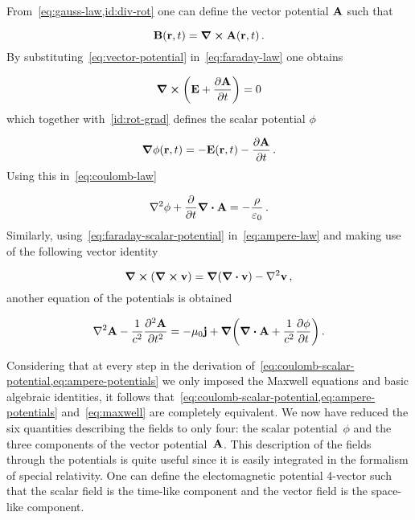\documentclass[12pt, class=report, crop=false]{standalone}
\begin{document}
\par
From~\cref{eq:gauss-law,id:div-rot} one can define the vector potential \(\vb{A}\) such that

\begin{equation}
  \label{eq:vector-potential}
  \vb{B}(\vb{r}, t) = \curl{\vb{A}(\vb{r}, t)}\,.
\end{equation}
By substituting~\eqref{eq:vector-potential} in~\eqref{eq:faraday-law} one obtains

\begin{equation}
  \label{eq:faraday-vector-potential}
  \curl(\vb{E} + \pdv{\vb{A}}{t}) = 0
\end{equation}
which together with~\cref{id:rot-grad} defines the scalar potential \(\phi\)

\begin{equation}
  \label{eq:faraday-scalar-potential}
  \grad{\phi}(\vb{r}, t) = -\vb{E}(\vb{r}, t) - \pdv{\vb{A}}{t}\,.
\end{equation}
Using this in~\cref{eq:coulomb-law}

\begin{equation}
  \label{eq:coulomb-scalar-potential}
  \laplacian{\phi} + \pdv{t}\div{\vb{A}} = - \frac{\rho}{\varepsilon_0}\,.
\end{equation}
Similarly, using~\cref{eq:faraday-scalar-potential} in~\cref{eq:ampere-law} and making use of the following vector identity

\begin{equation}
  \label{eq:curl-of-curl}
  \curl(\curl{\vb{v}}) = \grad(\div{\vb{v}}) - \laplacian{\vb{v}}\,,
\end{equation}
another equation of the potentials is obtained

\begin{equation}
  \label{eq:ampere-potentials}
  \laplacian{\vb{A}} - \frac{1}{c^2}\pdv[2]{\vb{A}}{t} =
    -\mu_0 \vb{j} + \grad(\div{\vb{A}} + \frac{1}{c^2} \pdv{\phi}{t})\,.
\end{equation}

Considering that at every step in the derivation of~\cref{eq:coulomb-scalar-potential,eq:ampere-potentials} we only imposed the Maxwell equations and basic algebraic identities, it follows that~\cref{eq:coulomb-scalar-potential,eq:ampere-potentials} and~\cref{eq:maxwell} are completely equivalent.
We now have reduced the six quantities describing the fields to only four: the scalar potential~\(\phi\) and the three components of the vector potential~\(\vb{A}\).
This description of the fields through the potentials is quite useful since it is easily integrated in the formalism of special relativity. One can define the electomagnetic potential 4-vector such that the scalar field is the time-like component and the vector field is the space-like component.
\end{document}
